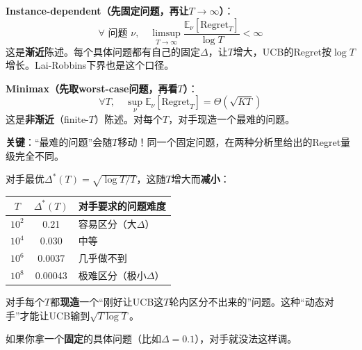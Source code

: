 \documentclass[11pt,a4paper]{article}
\theoremstyle{definition}
\begin{document}
\begin{keypoint}[两种渐近]
\textbf{Instance-dependent（先固定问题，再让$T\to\infty$）}：
\[
\forall \text{ 问题 } \nu,\quad \limsup_{T\to\infty} \frac{\mathbb{E}_\nu[\text{Regret}_T]}{\log T} < \infty
\]
这是\textbf{渐近}陈述。每个具体问题都有自己的固定$\Delta$，让$T$增大，UCB的Regret按$\log T$增长。Lai-Robbins下界也是这个口径。

\textbf{Minimax（先取worst-case问题，再看$T$）}：
\[
\forall T,\quad \sup_{\nu} \mathbb{E}_\nu[\text{Regret}_T] = \Theta(\sqrt{KT})
\]
这是\textbf{非渐近}（finite-$T$）陈述。对每个$T$，对手现造一个最难的问题。

\textbf{关键}：“最难的问题”会随$T$移动！同一个固定问题，在两种分析里给出的Regret量级完全不同。
\end{keypoint}

\begin{calculation}
对手最优$\Delta^*(T) = \sqrt{\log T / T}$，这随$T$增大而\textbf{减小}：

\begin{center}
\begin{tabular}{c|c|l}
\toprule
$T$ & $\Delta^*(T)$ & 对手要求的问题难度 \\
\midrule
$10^2$ & 0.21 & 容易区分（大$\Delta$） \\
$10^4$ & 0.030 & 中等 \\
$10^6$ & 0.0037 & 几乎做不到 \\
$10^8$ & 0.00043 & 极难区分（极小$\Delta$） \\
\bottomrule
\end{tabular}
\end{center}

对手每个$T$都\textbf{现造}一个“刚好让UCB这$T$轮内区分不出来的”问题。这种“动态对手”才能让UCB输到$\sqrt{T \log T}$。

如果你拿一个\textbf{固定}的具体问题（比如$\Delta = 0.1$），对手就没法这样调。
\end{calculation}
\end{document}
